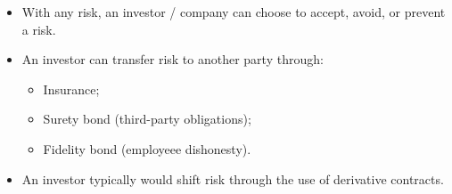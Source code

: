 \documentclass[../notes_compiled.tex]{subfiles}
\begin{document}
\begin{itemize}
\begin{itemize}
\begin{equation}
\delta = \frac{\mathrm{d}P_{\text{\tiny{Derivative}}}}{\mathrm{d}P_{\text{\tiny{Underlying}}}}.
\end{equation}
\item $\gamma$ is the sensitivity of $\delta$ to the price of the underlying,
\begin{equation}
\gamma = \frac{\mathrm{d}\delta}{\mathrm{d}P_{\text{\tiny{Underlying}}}} = \frac{\mathrm{d}^{2}P_{\text{\tiny{Derivative}}}}{\mathrm{d}P_{\text{\tiny{Underlying}}}^{2}}.
\end{equation}
\item Vega is the sensitivity of the derivative value to the volatility of the underlying,
\begin{equation}
\text{Vega} = \frac{\mathrm{d}P_{\text{\tiny{Derivative}}}}{\mathrm{d}\sigma_{\text{\tiny{Underlying}}}}.
\end{equation}
\item $\rho$ is the sensitivity of the derivative value to the risk-free rate,
\begin{equation}
\rho = \frac{\mathrm{d}P_{\text{\tiny{Derivative}}}}{\mathrm{d}R_{f}}.
\end{equation}
\end{itemize}
\item With any risk, an investor / company can choose to accept, avoid, or prevent a risk.
\item An investor can transfer risk to another party through:
\begin{itemize}
\item Insurance;
\item Surety bond (third-party obligations);
\item Fidelity bond (employeee dishonesty).
\end{itemize}
\item An investor typically would shift risk through the use of derivative contracts.
\end{itemize}
\end{document}
